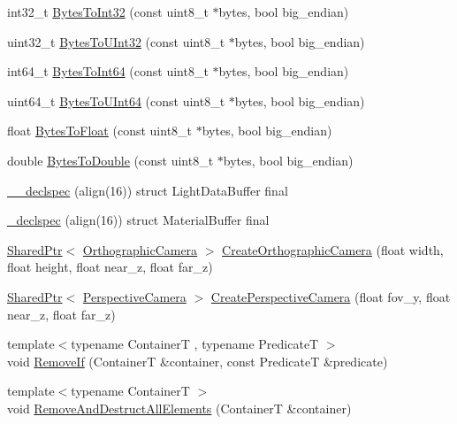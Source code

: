 \begin{DoxyCompactItemize}
\item 
int32\+\_\+t \hyperlink{namespacemage_a274862b36cabc10b90dd7148d42a29a6}{Bytes\+To\+Int32} (const uint8\+\_\+t $\ast$bytes, bool big\+\_\+endian)
\item 
uint32\+\_\+t \hyperlink{namespacemage_a46a019c7f927a6f559b36a8b5c01ab9c}{Bytes\+To\+U\+Int32} (const uint8\+\_\+t $\ast$bytes, bool big\+\_\+endian)
\item 
int64\+\_\+t \hyperlink{namespacemage_a09884643d0e3afe8591f9104785ce480}{Bytes\+To\+Int64} (const uint8\+\_\+t $\ast$bytes, bool big\+\_\+endian)
\item 
uint64\+\_\+t \hyperlink{namespacemage_a93f1f8baabf199005ea96e0a2b6941e3}{Bytes\+To\+U\+Int64} (const uint8\+\_\+t $\ast$bytes, bool big\+\_\+endian)
\item 
float \hyperlink{namespacemage_a5e41913a3a1613add8511e5834e09277}{Bytes\+To\+Float} (const uint8\+\_\+t $\ast$bytes, bool big\+\_\+endian)
\item 
double \hyperlink{namespacemage_af85b8ba1e336f37fc8fe34a53e981a6c}{Bytes\+To\+Double} (const uint8\+\_\+t $\ast$bytes, bool big\+\_\+endian)
\item 
\hyperlink{namespacemage_acb52a2b7136d871548446f56ecb1b36c}{\+\_\+\+\_\+declspec} (align(16)) struct Light\+Data\+Buffer final
\item 
\hyperlink{namespacemage_a76dac28d69746bdef408a08c36a7c862}{\+\_\+declspec} (align(16)) struct Material\+Buffer final
\item 
\hyperlink{namespacemage_a1e01ae66713838a7a67d30e44c67703e}{Shared\+Ptr}$<$ \hyperlink{classmage_1_1_orthographic_camera}{Orthographic\+Camera} $>$ \hyperlink{namespacemage_aec09581a328a83e6f87cbf572a85ba6c}{Create\+Orthographic\+Camera} (float width, float height, float near\+\_\+z, float far\+\_\+z)
\item 
\hyperlink{namespacemage_a1e01ae66713838a7a67d30e44c67703e}{Shared\+Ptr}$<$ \hyperlink{classmage_1_1_perspective_camera}{Perspective\+Camera} $>$ \hyperlink{namespacemage_a4431fdebdb526878bacc4028cb94a63b}{Create\+Perspective\+Camera} (float fov\+\_\+y, float near\+\_\+z, float far\+\_\+z)
\item 
{\footnotesize template$<$typename ContainerT , typename PredicateT $>$ }\\void \hyperlink{namespacemage_a403ff95eb779de1fbbf139661feb2d1b}{Remove\+If} (ContainerT \&container, const PredicateT \&predicate)
\item 
{\footnotesize template$<$typename ContainerT $>$ }\\void \hyperlink{namespacemage_a56c8c38aee820faf885024ed22e70a8e}{Remove\+And\+Destruct\+All\+Elements} (ContainerT \&container)

\end{DoxyCompactItemize}
